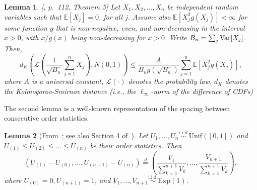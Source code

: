 \documentclass[11pt]{article}
\newtheorem{lemma}{Lemma}
\newcommand{\Var}{\textnormal{Var}}
\def\E{\mathbb{E}}
\begin{document}
\begin{lemma}\label{lem:Berry_Esseen}[\cite{petrov1975independent}, p.~112, Theorem 5]
Let $X_1, X_2, \ldots, X_{n}$ be independent random variables such that $\E[X_j] = 0$, for all $j$. Assume also $\E[X_j^2 g(X_j)] < \infty$ for some function $g$ that is non-negative, even, and non-decreasing in the interval $x > 0$, with $x / g(x)$ being non-decreasing for $x > 0$. Write $B_{n} = \sum_{j}\Var[X_j]$. Then,
\[d_{K}\left(\mathcal{L}\left(\frac{1}{\sqrt{B_{n}}}\sum_{j=1}^{n}X_j\right), N(0, 1)\right)\le \frac{A}{B_n g(\sqrt{B_n})}\sum_{j=1}^{n}\E\left[X_j^2 g(X_j)\right],\]
where $A$ is a universal constant, $\mathcal{L}(\cdot)$ denotes the probability law, $d_{K}$ denotes the Kolmogorov-Smirnov distance (i.e., the $\ell_{\infty}$-norm of the difference of CDFs)
\end{lemma}

The second lemma is a well-known representation of the spacing between consecutive order statistics. 
\begin{lemma}[From~\cite{moran1947random}; see also Section 4 of~\cite{arnold2008first}]\label{lem:moran}
  Let $U_1, \ldots, U_n\stackrel{i.i.d.}{\sim}\mathrm{Unif}([0, 1])$ and $U_{(1)} \le U_{(2)}\le \ldots \le U_{(n)}$ be their order statistics. Then
\[
(U_{(1)} - U_{(0)}, \ldots, U_{(n+1)} - U_{(n)}) \stackrel{d}{=} \left(\frac{V_1}{\sum_{k=1}^{n+1}V_{k}}, \ldots, \frac{V_{n+1}}{\sum_{k=1}^{n+1}V_{k}}\right),
\]
where $U_{(0)} = 0, U_{(n + 1)}= 1$, and $V_{1},\ldots, V_{n+1}\stackrel{\mathrm{i.i.d.}}{\sim}\mathrm{Exp}(1)$.
\end{lemma}
\end{document}
